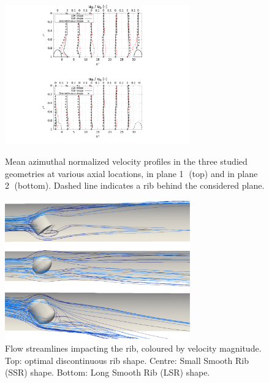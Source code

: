 \begin{figure}[p]

\begin{minipage}[c][11.5cm][t]{1.0\linewidth}
\centering
\includegraphics[width=8cm]{fig/applications/optim/Azimuthal_vel_compare.pdf}
\caption{Mean azimuthal normalized velocity profiles in the three studied geometries at various axial locations, in plane \textcircled{1} (top) and in plane \textcircled{2} (bottom). Dashed line indicates a rib behind the considered plane.}
\label{azimuthal_vel_compare}
\end{minipage}

\begin{minipage}[c][11.5cm][c]{1.0\linewidth}
\centering
\includegraphics[width=8cm]{fig/applications/optim/Streamlines_compare.pdf}
\caption{Flow streamlines impacting the rib, coloured by velocity magnitude. Top: optimal discontinuous rib shape. Centre: Small Smooth Rib (SSR) shape. Bottom: Long Smooth Rib (LSR) shape.}
\label{streamlines_compare}
\end{minipage}

\end{figure}

